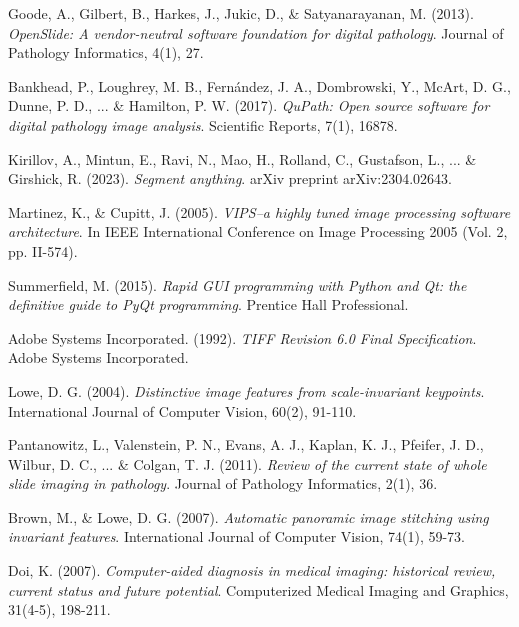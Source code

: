 \documentclass[12pt,a4paper]{report}
\begin{document}
\begin{thebibliography}{20}

Goode, A., Gilbert, B., Harkes, J., Jukic, D., \& Satyanarayanan, M. (2013). 
\textit{OpenSlide: A vendor-neutral software foundation for digital pathology}. 
Journal of Pathology Informatics, 4(1), 27.

Bankhead, P., Loughrey, M. B., Fernández, J. A., Dombrowski, Y., McArt, D. G., Dunne, P. D., ... \& Hamilton, P. W. (2017). 
\textit{QuPath: Open source software for digital pathology image analysis}. 
Scientific Reports, 7(1), 16878.

Kirillov, A., Mintun, E., Ravi, N., Mao, H., Rolland, C., Gustafson, L., ... \& Girshick, R. (2023). 
\textit{Segment anything}. 
arXiv preprint arXiv:2304.02643.

Martinez, K., \& Cupitt, J. (2005). 
\textit{VIPS–a highly tuned image processing software architecture}. 
In IEEE International Conference on Image Processing 2005 (Vol. 2, pp. II-574).

Summerfield, M. (2015). 
\textit{Rapid GUI programming with Python and Qt: the definitive guide to PyQt programming}. 
Prentice Hall Professional.

Adobe Systems Incorporated. (1992). 
\textit{TIFF Revision 6.0 Final Specification}. 
Adobe Systems Incorporated.

Lowe, D. G. (2004). 
\textit{Distinctive image features from scale-invariant keypoints}. 
International Journal of Computer Vision, 60(2), 91-110.

Pantanowitz, L., Valenstein, P. N., Evans, A. J., Kaplan, K. J., Pfeifer, J. D., Wilbur, D. C., ... \& Colgan, T. J. (2011). 
\textit{Review of the current state of whole slide imaging in pathology}. 
Journal of Pathology Informatics, 2(1), 36.

Brown, M., \& Lowe, D. G. (2007). 
\textit{Automatic panoramic image stitching using invariant features}. 
International Journal of Computer Vision, 74(1), 59-73.

Doi, K. (2007). 
\textit{Computer-aided diagnosis in medical imaging: historical review, current status and future potential}. 
Computerized Medical Imaging and Graphics, 31(4-5), 198-211.

\end{thebibliography}
\end{document}
